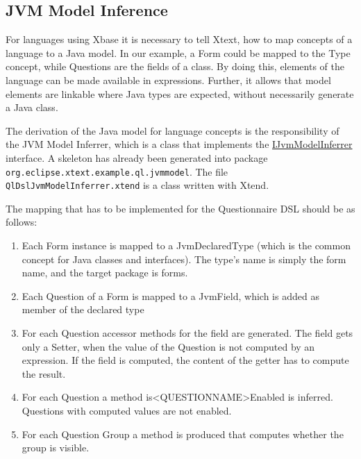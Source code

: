 \subsection{JVM Model Inference}

For languages using Xbase it is necessary to tell Xtext, how to map concepts of a language to a Java model. In our example,
a Form could be mapped to the Type concept, while Questions are the fields of a class. By doing this, elements of the language
can be made available in expressions. Further, it allows that model elements are linkable where Java types are expected, without
necessarily generate a Java class.

The derivation of the Java model for language concepts is the responsibility of the JVM Model Inferrer, which is a class that implements
the \href{http://download.eclipse.org/modeling/tmf/xtext/javadoc/2.3/org/eclipse/xtext/xbase/jvmmodel/IJvmModelInferrer.html}{IJvmModelInferrer} interface.
A skeleton has already been generated into package \texttt{org.eclipse.xtext.example.ql.jvmmodel}. The file \texttt{QlDslJvmModelInferrer.xtend} is a class
written with Xtend.

The mapping that has to be implemented for the Questionnaire DSL should be as follows:
\begin{enumerate}
  \item Each Form instance is mapped to a JvmDeclaredType (which is the common concept for Java classes and interfaces).
  The type's name is simply the form name, and the target package is forms.
  \item Each Question of a Form is mapped to a JvmField, which is added as member of the declared type
  \item For each Question accessor methods for the field are generated. The field gets only a Setter, when the value of the Question is
  not computed by an expression. If the field is computed, the content of the getter has to compute the result.
  \item For each Question a method is<QUESTIONNAME>Enabled is inferred.
  Questions with computed values are not enabled.
  \item For each Question Group a method is produced that computes whether the
  group is visible. 
\end{enumerate}

